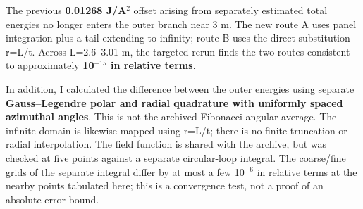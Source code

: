 \documentclass[10pt,a4paper]{article}
\begin{document}
{\par
The previous \textbf{0.01268 J/A$^2$} offset arising from separately estimated total energies no longer enters the outer branch near 3 m. The new route A uses panel integration plus a tail extending to infinity; route B uses the direct substitution r=L/t. Across L=2.6--3.01 m, the targeted rerun finds the two routes consistent to approximately \textbf{10$^{-15}$ in relative terms}.
\par
In addition, I calculated the difference between the outer energies using separate \textbf{Gauss--Legendre polar and radial quadrature with uniformly spaced azimuthal angles}. This is not the archived Fibonacci angular average. The infinite domain is likewise mapped using r=L/t; there is no finite truncation or radial interpolation. The field function is shared with the archive, but was checked at five points against a separate circular-loop integral. The coarse/fine grids of the separate integral differ by at most a few 10$^{-6}$ in relative terms at the nearby points tabulated here; this is a convergence test, not a proof of an absolute error bound.
\par
\begin{center}\vspace{-2pt}\end{center}
}
\end{document}
